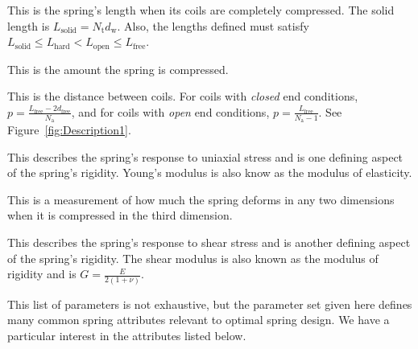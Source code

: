 \documentclass[10pt]{article}
\begin{document}
\begin{description}[leftmargin=!,labelwidth=\widthof{\bfseries Young's Modulus (E)}]
			\item[Solid Length ($\boldsymbol{L}_{\text{solid}}$)] This is the spring's length when its coils are completely compressed. The solid length is $L_{\text{solid}} = N_{\text{t}}d_{\text{w}}$. Also, the lengths defined must satisfy ${L_{\text{solid}} \le L_{\text{hard}} < L_{\text{open}} \le L_{\text{free}}}$.
			
			\item[Deflection ($\boldsymbol{s}$)] This is the amount the spring is compressed.
					
			\item[Pitch ($\boldsymbol{p}$)] This is the distance between coils. For coils with \textit{closed} end conditions, ${p = \frac{L_{\text{free}}-2d_{\text{free}}}{N_{\text{a}}}}$, and for coils with \textit{open} end conditions, $p = \frac{L_{\text{free}}}{N_{\text{a}}-1}$. See Figure~\ref{fig:Description1}.			
			
			\item[Young's Modulus ($\boldsymbol{E}$)] This describes the spring's response to uniaxial stress and is one defining aspect of the spring's rigidity. Young's modulus is also know as the modulus of elasticity.
			
			\item[Poisson Ratio ($\boldsymbol{\nu}$)] This is a measurement of how much the spring deforms in any two dimensions when it is compressed in the third dimension.
			
			\item[Shear Modulus ($\boldsymbol{G}$)] This describes the spring's response to shear stress and is another defining aspect of the spring's rigidity. The shear modulus is also known as the modulus of rigidity and is $G = \frac{E}{2(1+\nu)}$. 
		
		\end{description}

This list of parameters is not exhaustive, but the parameter set given here defines many common spring attributes relevant to optimal spring design. We have a particular interest in the attributes listed below.
\end{document}
